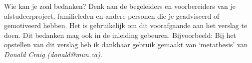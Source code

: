 
Wie kan je zoal bedanken? Denk aan de begeleiders en voorbereiders van
je afstudeerproject, familieleden en andere personen die je
geadviseerd of gemotiveerd hebben.  Het is gebruikelijk om dit
voorafgaande aan het verslag te doen. Dit bedanken mag ook in de
inleiding gebeuren. Bijvoorbeeld: Bij het opstellen van dit verslag
heb ik dankbaar gebruik gemaakt van `metathesis' van \emph{Donald Craig
(donald@mun.ca)}.


